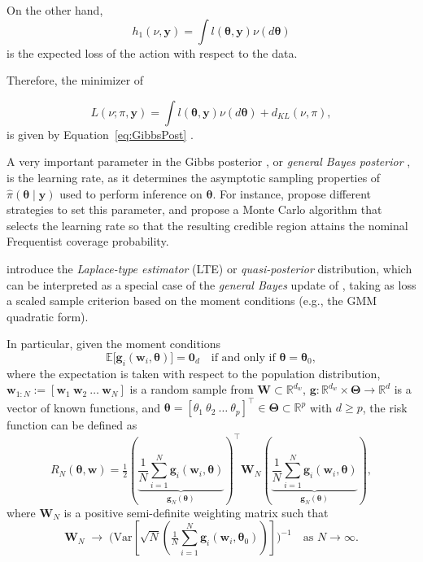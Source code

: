 On the other hand, 
\[
h_1(\nu,\mathbf{y})=\int l(\boldsymbol{\theta},\mathbf{y})\nu(d\boldsymbol{\theta})
\]  
is the expected loss of the action with respect to the data.

Therefore, the minimizer of

\[
L(\nu;\pi,\mathbf{y})=\int l(\boldsymbol{\theta},\mathbf{y})\nu(d\boldsymbol{\theta})+d_{KL}(\nu,\pi),
\] 
is given by Equation~\ref{eq:GibbsPost} \cite{Zhang2006KLentropy,Jiang2008,bissiri2016general}.

A very important parameter in the Gibbs posterior \cite{Jiang2008}, or \textit{general Bayes posterior} \cite{bissiri2016general}, is the learning rate, as it determines the asymptotic sampling properties of $\hat{\pi}(\boldsymbol{\theta}\mid\mathbf{y})$ used to perform inference on $\boldsymbol{\theta}$. For instance, \cite{bissiri2016general} propose different strategies to set this parameter, and \cite{Syring2019} propose a Monte Carlo algorithm that selects the learning rate so that the resulting credible region attains the nominal Frequentist coverage probability.

\cite{chernozhukov2003mcmc} introduce the \emph{Laplace-type estimator} (LTE) or \textit{quasi-posterior} distribution, which can be interpreted as a special case of the \emph{general Bayes} update of \cite{bissiri2016general}, taking as loss a scaled sample criterion based on the moment conditions (e.g., the GMM quadratic form).

In particular, given the moment conditions
\[
\mathbb{E}\!\big[\mathbf{g}_i(\mathbf{w}_i,\boldsymbol{\theta})\big]=\mathbf{0}_{d} 
\quad \text{if and only if } \boldsymbol{\theta}=\boldsymbol{\theta}_0,
\]
where the expectation is taken with respect to the population distribution, 
$\mathbf{w}_{1:N}:=[\mathbf{w}_1 \ \mathbf{w}_2 \ \dots \ \mathbf{w}_N]$ is a random sample from $\mathbf{W}\subset \mathbb{R}^{d_w}$, 
$\mathbf{g}:\mathbb{R}^{d_w}\times\boldsymbol{\Theta}\to\mathbb{R}^{d}$ is a vector of known functions, and 
$\boldsymbol{\theta}=[\theta_{1}\ \theta_{2}\ \dots\ \theta_{p}]^{\top}\in\boldsymbol{\Theta}\subset\mathbb{R}^{p}$ with $d\geq p$, the risk function can be defined as
\[
R_N(\boldsymbol{\theta},\mathbf{w})=\tfrac{1}{2}\left(\underbrace{\frac{1}{N}\sum_{i=1}^N \mathbf{g}_i(\mathbf{w}_i,\boldsymbol{\theta})}_{\mathbf{g}_N(\boldsymbol{\theta})}\right)^{\top}\mathbf{W}_N\left(\underbrace{\frac{1}{N}\sum_{i=1}^N\mathbf{g}_i(\mathbf{w}_i,\boldsymbol{\theta})}_{\mathbf{g}_N(\boldsymbol{\theta})}\right),
\]
where $\mathbf{W}_N$ is a positive semi-definite weighting matrix such that
\[
\mathbf{W}_N \;\to\; 
\Bigg(\text{Var}\left[\sqrt{N}\left(\tfrac{1}{N}\sum_{i=1}^N \mathbf{g}_i(\mathbf{w}_i,\boldsymbol{\theta}_0)\right)\right]\Bigg)^{-1}
\quad \text{as } N\rightarrow \infty.
\]  

